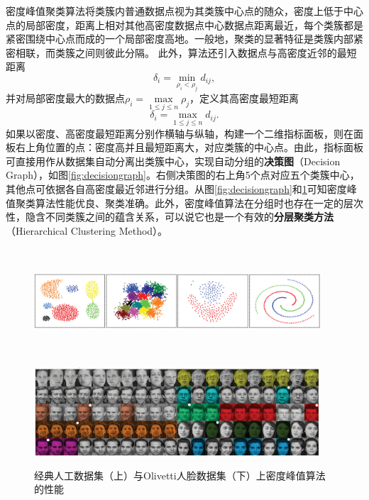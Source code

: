 密度峰值聚类算法将类簇内普通数据点视为其类簇中心点的随众，密度上低于中心点的局部密度，距离上相对其他高密度数据点中心数据点距离最近，每个类簇都是紧密围绕中心点而成的一个局部密度高地。一般地，聚类的显著特征是类簇内部紧密相联，而类簇之间则彼此分隔。
此外，算法还引入数据点与高密度近邻的最短距离
\begin{equation}
    \delta_i = \min\limits_{\rho_i < \rho_j} d_{ij},
\end{equation}
并对局部密度最大的数据点$\rho_i = \max\limits_{1\le j\le n} \rho_j$，定义其高密度最短距离
\begin{equation}
    \delta_i = \max\limits_{1\le j\le n} d_{ij}.
\end{equation}
如果以密度、高密度最短距离分别作横轴与纵轴，构建一个二维指标面板，则在面板右上角位置的点：密度高并且最短距离大，对应类簇的中心点。由此，指标面板可直接用作从数据集自动分离出类簇中心，实现自动分组的\textbf{决策图}（Decision Graph），如图\ref{fig:decisiongraph}。右侧决策图的右上角5个点对应五个类簇中心，其他点可依据各自高密度最近邻进行分组。从图\ref{fig:decisiongraph}和\ref{fig:dpcluster}可知密度峰值聚类算法性能优良、聚类准确。此外，密度峰值算法在分组时也存在一定的层次性，隐含不同类簇之间的蕴含关系，可以说它也是一个有效的\textbf{分层聚类方法}（Hierarchical Clustering Method）。
\begin{figure}[ht]
    \begin{minipage}[t]{\linewidth}
        \centering
          \includegraphics[width=0.95\textwidth,height=4cm]{figures/densitypeak_clustering}
    \end{minipage}
    \begin{minipage}[t]{\linewidth}
        \centering
          \includegraphics[width=0.95\textwidth,height=4cm]{figures/densitypeak_olivettiface}
    \end{minipage}
    \caption{经典人工数据集（上）与Olivetti人脸数据集（下）上密度峰值算法的性能~\cite{rodriguez2014clustering}}\label{fig:dpcluster}
\end{figure}

